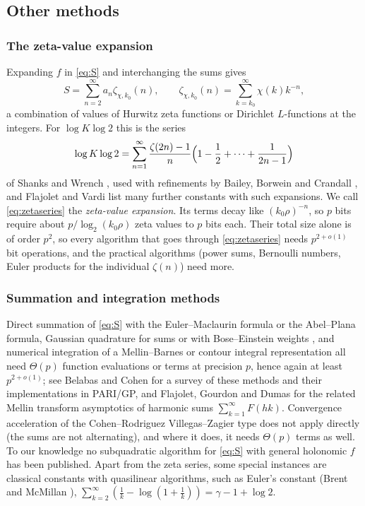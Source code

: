 \documentclass[11pt]{amsart}
\theoremstyle{definition}
\theoremstyle{remark}
\begin{document}
\subsection{Other methods}\label{sec:related}

\subsubsection{The zeta-value expansion}
Expanding $f$ in \eqref{eq:S} and interchanging the sums gives
\begin{equation}\label{eq:zetaseries}
  S = \sum_{n=2}^{\infty} a_n \zeta_{\chi, k_0}(n), \qquad \zeta_{\chi,k_0}(n) = \sum_{k=k_0}^{\infty} \chi(k) k^{-n},
\end{equation}
a combination of values of Hurwitz zeta functions or Dirichlet $L$-functions at the integers. For $\log K\log 2$ this
is the series
\[
  \log K\log 2 = \sum_{n=1}^{\infty} \frac{\zeta(2n)-1}{n} \Bigl(1 - \frac12 + \cdots + \frac{1}{2n-1}\Bigr)
\]
of Shanks and Wrench \cite{SW59}, used with refinements by Bailey, Borwein and Crandall \cite{BBC97}, and Flajolet and
Vardi \cite{FV96} list many further constants with such expansions. We call \eqref{eq:zetaseries} the
\emph{zeta-value expansion}. Its terms decay like $(k_0\rho)^{-n}$, so $p$ bits require about $p/\log_2(k_0\rho)$
zeta values to $p$ bits each. Their total size alone is of order $p^2$, so every algorithm that goes through
\eqref{eq:zetaseries} needs $p^{2+o(1)}$ bit operations, and the practical algorithms (power sums, Bernoulli
numbers, Euler products for the individual $\zeta(n)$) need more.

\subsubsection{Summation and integration methods}
Direct summation of \eqref{eq:S} with the Euler--Maclaurin formula or the Abel--Plana formula, Gaussian quadrature
for sums \cite{Mon10} or with Bose--Einstein weights \cite{GM85}, and numerical integration of a Mellin--Barnes or
contour integral representation all need $\Theta(p)$ function evaluations or terms at precision $p$, hence again at
least $p^{2+o(1)}$; see Belabas and Cohen \cite{BC21} for a survey of these methods and their implementations in
PARI/GP, and Flajolet, Gourdon and Dumas \cite{FGD95} for the related Mellin transform asymptotics of harmonic sums
$\sum_{k=1}^{\infty} F(hk)$. Convergence acceleration of the Cohen--Rodriguez Villegas--Zagier type \cite{CRVZ00} does not apply
directly (the sums are not alternating), and where it does, it needs $\Theta(p)$ terms as well. To our knowledge no
subquadratic algorithm for \eqref{eq:S} with general holonomic $f$ has been published. Apart from the zeta series, some
special instances are classical constants with quasilinear algorithms, such as Euler's constant (Brent and
McMillan \cite{BM80}), $\sum_{k=2}^{\infty}(\frac1k - \log(1+\frac1k)) = \gamma - 1 + \log 2$.
\end{document}
